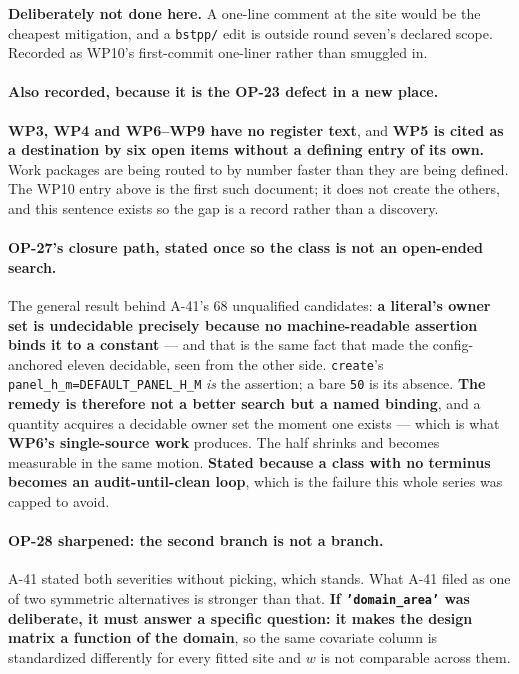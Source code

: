 \documentclass[
  10pt,
]{article}
\begin{document}
\textbf{Deliberately not done here.} A one-line comment at the site would be the cheapest mitigation, and a \texttt{bstpp/} edit is outside round seven's declared scope. Recorded as WP10's first-commit one-liner rather than smuggled in.

\paragraph{Also recorded, because it is the OP-23 defect in a new place.}
\textbf{WP3, WP4 and WP6--WP9 have no register text}, and \textbf{WP5 is cited as a destination by six open items without a defining entry of its own.} Work packages are being routed to by number faster than they are being defined. The WP10 entry above is the first such document; it does not create the others, and this sentence exists so the gap is a record rather than a discovery.

\paragraph{OP-27's closure path, stated once so the class is not an open-ended search.}
The general result behind A-41's 68 unqualified candidates: \textbf{a literal's owner set is undecidable precisely because no machine-readable assertion binds it to a constant} --- and that is the same fact that made the config-anchored eleven decidable, seen from the other side. \texttt{create}'s \texttt{panel\_h\_m=DEFAULT\_PANEL\_H\_M} \emph{is} the assertion; a bare \texttt{50} is its absence. \textbf{The remedy is therefore not a better search but a named binding}, and a quantity acquires a decidable owner set the moment one exists --- which is what \textbf{WP6's single-source work} produces. The half shrinks and becomes measurable in the same motion. \textbf{Stated because a class with no terminus becomes an audit-until-clean loop}, which is the failure this whole series was capped to avoid.

\paragraph{OP-28 sharpened: the second branch is not a branch.}
A-41 stated both severities without picking, which stands. What A-41 filed as one of two symmetric alternatives is stronger than that. \textbf{If \texttt{'domain\_area'} was deliberate, it must answer a specific question: it makes the design matrix a function of the domain}, so the same covariate column is standardized differently for every fitted site and \(w\) is not comparable across them.
\end{document}
